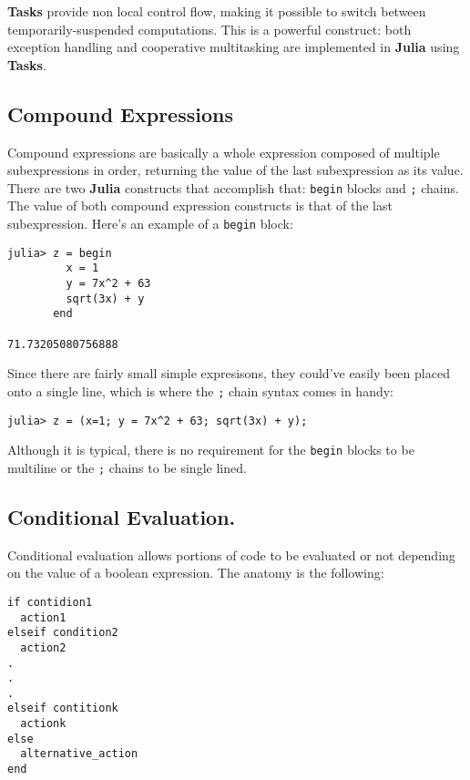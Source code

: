 \documentclass[
]{article}
\begin{document}
\textbf{Tasks} provide non local control flow, making it possible to
switch between temporarily-suspended computations. This is a powerful
construct: both exception handling and cooperative multitasking are
implemented in \textbf{Julia} using \textbf{Tasks}.

\hypertarget{compound-expressions}{%
\subsection{\texorpdfstring{\textbf{Compound
Expressions}}{Compound Expressions}}\label{compound-expressions}}

Compound expressions are basically a whole expression composed of
multiple subexpressions in order, returning the value of the last
subexpression as its value. There are two \textbf{Julia} constructs that
accomplish that: \texttt{begin} blocks and \texttt{;} chains. The value
of both compound expression constructs is that of the last
subexpression. Here's an example of a \texttt{begin} block:

\begin{verbatim}
julia> z = begin
         x = 1
         y = 7x^2 + 63
         sqrt(3x) + y
       end

71.73205080756888
\end{verbatim}

Since there are fairly small simple expresisons, they could've easily
been placed onto a single line, which is where the \texttt{;} chain
syntax comes in handy:

\begin{verbatim}
julia> z = (x=1; y = 7x^2 + 63; sqrt(3x) + y);
\end{verbatim}

Although it is typical, there is no requirement for the \texttt{begin}
blocks to be multiline or the \texttt{;} chains to be single lined.

\hypertarget{conditional-evaluation.}{%
\subsection{\texorpdfstring{\textbf{Conditional
Evaluation}.}{Conditional Evaluation.}}\label{conditional-evaluation.}}

Conditional evaluation allows portions of code to be evaluated or not
depending on the value of a boolean expression. The anatomy is the
following:

\begin{verbatim}
if contidion1
  action1
elseif condition2
  action2
.
.
.
elseif contitionk
  actionk
else
  alternative_action
end
\end{verbatim}
\end{document}
